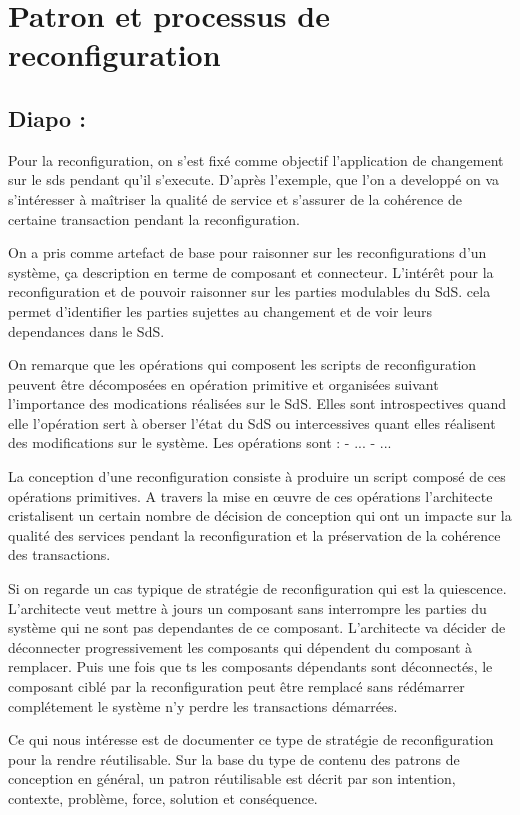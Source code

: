\section{Patron et processus de reconfiguration}

\subsection{Diapo :}

Pour la reconfiguration, on s'est fixé comme objectif l'application
de changement sur le sds pendant qu'il s'execute. 
D'après l'exemple, que l'on a developpé on va  s'intéresser à
maîtriser la qualité de service  et
s'assurer de la cohérence de certaine transaction pendant la
reconfiguration.

On a pris comme artefact de base pour raisonner sur les reconfigurations
d'un système, ça description en terme de composant et connecteur.
L'intérêt pour la reconfiguration et de pouvoir raisonner sur les
parties modulables du SdS.  cela permet d'identifier les parties
sujettes au changement et de voir leurs dependances dans le SdS.

On remarque que les opérations qui composent les scripts de
reconfiguration peuvent être décomposées en opération primitive et
organisées suivant l'importance des modications réalisées sur le SdS. 
Elles sont introspectives quand elle l'opération sert à oberser l'état
du SdS ou intercessives quant elles réalisent des modifications sur le
système. Les opérations sont : 
- ... 
- ...

La conception d'une reconfiguration consiste à produire un script
composé de ces opérations primitives. A travers la mise en \oe{}uvre
de ces opérations l'architecte cristalisent un certain nombre de
décision de conception qui ont un impacte sur la qualité des services
pendant la reconfiguration et la préservation de la cohérence des
transactions. 

Si on regarde un cas typique de stratégie de
reconfiguration qui est la quiescence. L'architecte veut mettre à
jours un composant sans interrompre les parties du système qui ne sont
pas dependantes de ce composant. L'architecte va décider de déconnecter
progressivement les composants qui dépendent du composant à
remplacer. Puis une fois que ts les composants dépendants sont
déconnectés, le composant ciblé par la reconfiguration peut être
remplacé sans rédémarrer complétement le système n'y perdre les
transactions démarrées.


Ce qui nous intéresse est de documenter ce type de stratégie de
reconfiguration pour la rendre réutilisable. Sur la base du type de
contenu des patrons de conception en général, un patron réutilisable
est décrit par son intention, contexte, problème, force, solution et
conséquence. 

